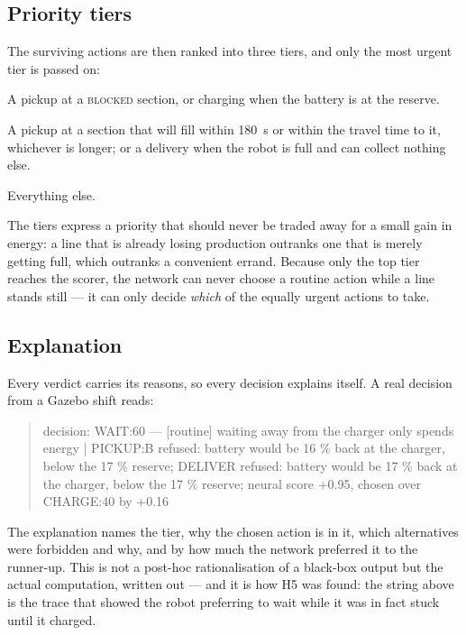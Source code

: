 \subsection{Priority tiers}
\label{sec:tiers}

The surviving actions are then ranked into three tiers, and only the most urgent tier is passed
on:

\begin{description}[leftmargin=1.2em, style=nextline, itemsep=0.2em]
  \item[Tier 2 --- unblock a stopped line.] A pickup at a \textsc{blocked} section, or charging
        when the battery is at the reserve.
  \item[Tier 1 --- prevent a line from stopping.] A pickup at a section that will fill within
        \SI{180}{\second} or within the travel time to it, whichever is longer; or a delivery when
        the robot is full and can collect nothing else.
  \item[Tier 0 --- routine.] Everything else.
\end{description}

The tiers express a priority that should never be traded away for a small gain in energy: a line
that is already losing production outranks one that is merely getting full, which outranks a
convenient errand. Because only the top tier reaches the scorer, the network can never choose a
routine action while a line stands still --- it can only decide \emph{which} of the equally urgent
actions to take.

\subsection{Explanation}
\label{sec:explanations}

Every verdict carries its reasons, so every decision explains itself. A real decision from a
Gazebo shift reads:

\begin{quote}\ttfamily\small
decision: WAIT:60 --- [routine] waiting away from the charger only spends energy |
PICKUP:B refused: battery would be 16 \% back at the charger, below the 17 \% reserve;
DELIVER refused: battery would be 17 \% back at the charger, below the 17 \% reserve;
neural score +0.95, chosen over CHARGE:40 by +0.16
\end{quote}

The explanation names the tier, why the chosen action is in it, which alternatives were forbidden
and why, and by how much the network preferred it to the runner-up. This is not a post-hoc
rationalisation of a black-box output but the actual computation, written out --- and it is how H5
was found: the string above is the trace that showed the robot preferring to wait while it was in
fact stuck until it charged.

